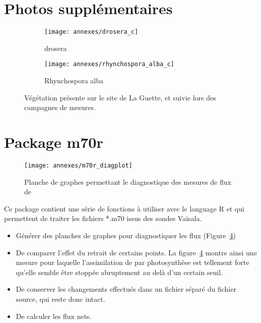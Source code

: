 \section{Photos supplémentaires}
\label{sec:photos_veg}


\begin{figure}[!htbp]
    \centering
    \begin{subfigure}[b]{.75\textwidth}
        \centering \texttt{[image: annexes/drosera\_c]}
        \caption{drosera}\label{fig:dro}
    \end{subfigure}
    \begin{subfigure}[b]{.6\textwidth}
            \centering \texttt{[image: annexes/rhynchospora\_alba\_c]}
            \caption{Rhynchospora alba}\label{fig:rhy}
    \end{subfigure}
    \caption{Végétation présente sur le site de La Guette, et suivie lors des campagnes de mesures.}\label{fig:veg_other}
\end{figure}





\section{Package m70r}
\label{sec:pckg_m70r}

\begin{figure}[!htbp]
\centering
\texttt{[image: annexes/m70r\_diagplot]}
\caption{Planche de graphes permettant le diagnostique des mesures de flux de \coo}
\label{fig:m70r_diagplot}
\end{figure}

Ce package contient une série de fonctions à utiliser avec le language R et qui permettent de traiter les fichiers *.m70 issus des sondes Vaisala.

\begin{itemize}
\item Générer des planches de graphes pour diagnostiquer les flux (Figure~\ref{fig:m70r_diagplot})
\item De comparer l'effet du retrait de certains points. La figure~\ref{fig:m70r_diagplot} montre ainsi une mesure pour laquelle l'assimilation de \coo par photosynthèse est tellement forte qu'elle semble être stoppée abruptement au delà d'un certain seuil.
\item De conserver les changements effectués dans un fichier séparé du fichier source, qui reste donc intact.
\item De calculer les flux nets.
\end{itemize}

